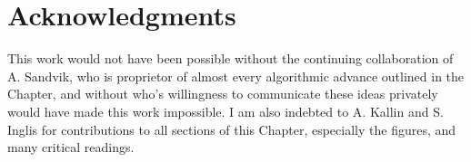 \documentclass[vecphys]{svmult}
\begin{document}
\section{Acknowledgments}  
This work would not have been possible without the continuing collaboration of A. Sandvik, who is proprietor of almost every algorithmic advance outlined in the Chapter, and without who's willingness to communicate these ideas privately would have made this work impossible.
I am also indebted to A. Kallin and S. Inglis for contributions to all sections of this Chapter, especially the figures, and many critical readings.

 
 
%
%


\printindex
\end{document}
